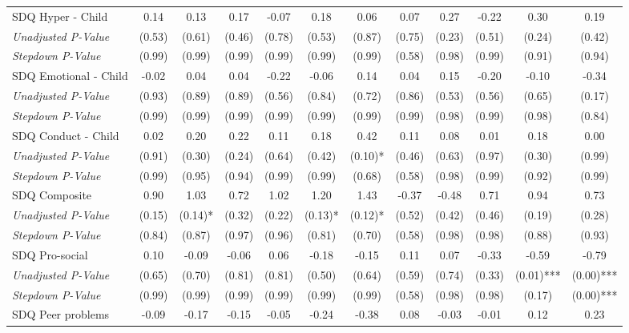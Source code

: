 \begin{tabular}{l c c c c c c c c c c c}
SDQ Hyper - Child & 0.14 & 0.13 & 0.17 & -0.07 & 0.18 & 0.06 & 0.07 & 0.27 & -0.22 & 0.30 & 0.19 \\
\quad \textit{Unadjusted P-Value} & (0.53) & (0.61) & (0.46) & (0.78) & (0.53) & (0.87) & (0.75) & (0.23) & (0.51) & (0.24) & (0.42) \\
\quad \textit{Stepdown P-Value} & (0.99) & (0.99) & (0.99) & (0.99) & (0.99) & (0.99) & (0.58) & (0.98) & (0.99) & (0.91) & (0.94) \\
SDQ Emotional - Child & -0.02 & 0.04 & 0.04 & -0.22 & -0.06 & 0.14 & 0.04 & 0.15 & -0.20 & -0.10 & -0.34 \\
\quad \textit{Unadjusted P-Value} & (0.93) & (0.89) & (0.89) & (0.56) & (0.84) & (0.72) & (0.86) & (0.53) & (0.56) & (0.65) & (0.17) \\
\quad \textit{Stepdown P-Value} & (0.99) & (0.99) & (0.99) & (0.99) & (0.99) & (0.99) & (0.99) & (0.98) & (0.99) & (0.98) & (0.84) \\
SDQ Conduct - Child & 0.02 & 0.20 & 0.22 & 0.11 & 0.18 & 0.42 & 0.11 & 0.08 & 0.01 & 0.18 & 0.00 \\
\quad \textit{Unadjusted P-Value} & (0.91) & (0.30) & (0.24) & (0.64) & (0.42) & (0.10)* & (0.46) & (0.63) & (0.97) & (0.30) & (0.99) \\
\quad \textit{Stepdown P-Value} & (0.99) & (0.95) & (0.94) & (0.99) & (0.99) & (0.68) & (0.58) & (0.98) & (0.99) & (0.92) & (0.99) \\
SDQ Composite & 0.90 & 1.03 & 0.72 & 1.02 & 1.20 & 1.43 & -0.37 & -0.48 & 0.71 & 0.94 & 0.73 \\
\quad \textit{Unadjusted P-Value} & (0.15) & (0.14)* & (0.32) & (0.22) & (0.13)* & (0.12)* & (0.52) & (0.42) & (0.46) & (0.19) & (0.28) \\
\quad \textit{Stepdown P-Value} & (0.84) & (0.87) & (0.97) & (0.96) & (0.81) & (0.70) & (0.58) & (0.98) & (0.98) & (0.88) & (0.93) \\
SDQ Pro-social & 0.10 & -0.09 & -0.06 & 0.06 & -0.18 & -0.15 & 0.11 & 0.07 & -0.33 & -0.59 & -0.79 \\
\quad \textit{Unadjusted P-Value} & (0.65) & (0.70) & (0.81) & (0.81) & (0.50) & (0.64) & (0.59) & (0.74) & (0.33) & (0.01)*** & (0.00)*** \\
\quad \textit{Stepdown P-Value} & (0.99) & (0.99) & (0.99) & (0.99) & (0.99) & (0.99) & (0.58) & (0.98) & (0.98) & (0.17) & (0.00)*** \\
SDQ Peer problems & -0.09 & -0.17 & -0.15 & -0.05 & -0.24 & -0.38 & 0.08 & -0.03 & -0.01 & 0.12 & 0.23 \\

\end{tabular}
